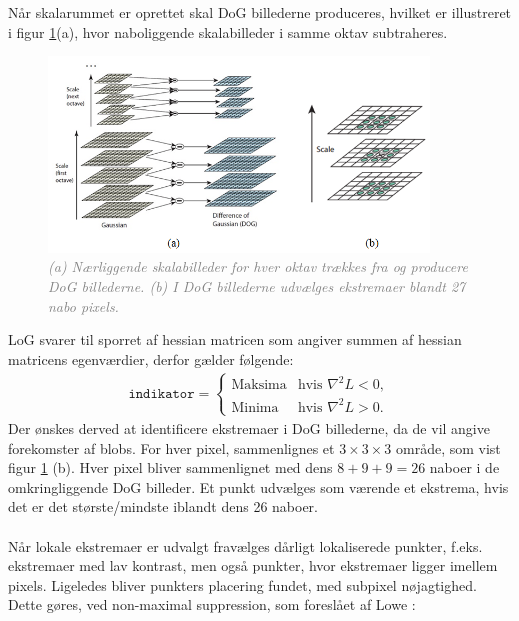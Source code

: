 Når skalarummet er oprettet skal DoG billederne produceres, hvilket er illustreret i figur \ref{fig:difference}(a), hvor naboliggende skalabilleder i samme oktav subtraheres. \begin{figure}[H]
    \centering
    \includegraphics[width=0.90\textwidth]{fig/30.png}
     \vspace{-1em}
    \begin{center}    
       \caption{\textcolor{gray}{\footnotesize \textit{(a) Nærliggende skalabilleder for hver oktav trækkes fra og producere DoG billederne. (b) I DoG billederne udvælges ekstremaer blandt 27 nabo pixels.}}}
    \label{fig:difference}
     \end{center}
     \vspace{-2.5em}
  \end{figure} \noindent    
LoG svarer til sporret af hessian matricen som angiver summen af hessian matricens egenværdier, derfor gælder følgende:
\begin{equation}
\begin{split}
\texttt{indikator} = 
\begin{cases}
\text{Maksima}& \text{hvis } \nabla^2L < 0,  \\
\text{Minima} & \text{hvis } \nabla^2L > 0.
\end{cases}
\end{split}
\label{detman}
\end{equation}
Der ønskes derved at identificere ekstremaer i DoG billederne, da de vil angive forekomster af blobs. For hver pixel, sammenlignes et $3\times3\times3$ område, som vist figur \ref{fig:difference} (b). Hver pixel bliver sammenlignet med dens $8+9+9=26$ naboer i de omkringliggende DoG billeder. Et punkt udvælges som værende et ekstrema, hvis det er det største/mindste iblandt dens 26 naboer.
\\
\\
Når lokale ekstremaer er udvalgt fravælges dårligt lokaliserede punkter, f.eks. ekstremaer med lav kontrast, men også punkter, hvor ekstremaer ligger imellem pixels. Ligeledes bliver punkters placering fundet, med subpixel nøjagtighed. Dette gøres, ved non-maximal suppression, som foreslået af Lowe \cite{nonmaximalsuppression}:
